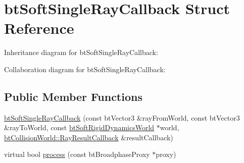\hypertarget{structbt_soft_single_ray_callback}{\section{bt\+Soft\+Single\+Ray\+Callback Struct Reference}
\label{structbt_soft_single_ray_callback}
}


Inheritance diagram for bt\+Soft\+Single\+Ray\+Callback\+:


Collaboration diagram for bt\+Soft\+Single\+Ray\+Callback\+:
\subsection*{Public Member Functions}
\begin{DoxyCompactItemize}
\item 
\hyperlink{structbt_soft_single_ray_callback_ae3a700f866158df32a38877dc08eac9f}{bt\+Soft\+Single\+Ray\+Callback} (const bt\+Vector3 \&ray\+From\+World, const bt\+Vector3 \&ray\+To\+World, const \hyperlink{classbt_soft_rigid_dynamics_world}{bt\+Soft\+Rigid\+Dynamics\+World} $\ast$world, \hyperlink{structbt_collision_world_1_1_ray_result_callback}{bt\+Collision\+World\+::\+Ray\+Result\+Callback} \&result\+Callback)
\item 
virtual bool \hyperlink{structbt_soft_single_ray_callback_a9625cb3d48cfe194f1af2b52c4cf90cd}{process} (const bt\+Broadphase\+Proxy $\ast$proxy)
\end{DoxyCompactItemize}
